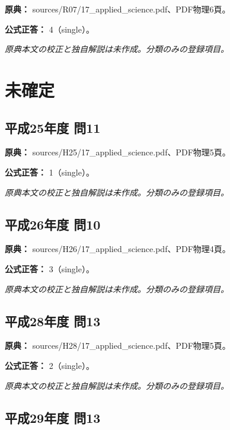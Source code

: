 \noindent\textbf{原典：} sources/R07/17\_applied\_science.pdf、PDF物理6頁。

\textbf{公式正答：} 4（single）。

\par\textit{原典本文の校正と独自解説は未作成。分類のみの登録項目。}

\section{未確定}

\subsection{平成25年度 問11}
\label{q:h25-reg-applied-11}

\noindent\textbf{原典：} sources/H25/17\_applied\_science.pdf、PDF物理5頁。

\textbf{公式正答：} 1（single）。

\par\textit{原典本文の校正と独自解説は未作成。分類のみの登録項目。}

\subsection{平成26年度 問10}
\label{q:h26-reg-applied-10}

\noindent\textbf{原典：} sources/H26/17\_applied\_science.pdf、PDF物理4頁。

\textbf{公式正答：} 3（single）。

\par\textit{原典本文の校正と独自解説は未作成。分類のみの登録項目。}

\subsection{平成28年度 問13}
\label{q:h28-reg-applied-13}

\noindent\textbf{原典：} sources/H28/17\_applied\_science.pdf、PDF物理5頁。

\textbf{公式正答：} 2（single）。

\par\textit{原典本文の校正と独自解説は未作成。分類のみの登録項目。}

\subsection{平成29年度 問13}
\label{q:h29-reg-applied-13}


